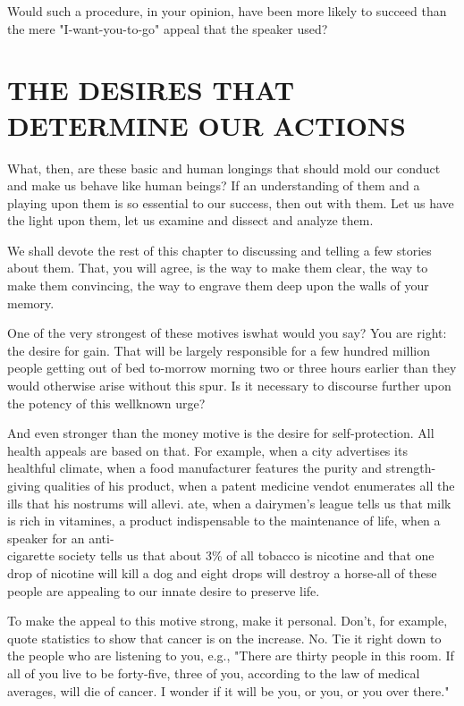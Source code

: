 \documentclass[10pt]{article}
\begin{document}
Would such a procedure, in your opinion, have been more likely to succeed than the mere "I-want-you-to-go" appeal that the speaker used?

\section*{THE DESIRES THAT DETERMINE OUR ACTIONS}
What, then, are these basic and human longings that should mold our conduct and make us behave like human beings? If an understanding of them and a playing upon them is so essential to our success, then out with them. Let us have the light upon them, let us examine and dissect and analyze them.

We shall devote the rest of this chapter to discussing and telling a few stories about them. That, you will agree, is the way to make them clear, the way to make them convincing, the way to engrave them deep upon the walls of your memory.

One of the very strongest of these motives iswhat would you say? You are right: the desire for gain. That will be largely responsible for a few hundred million people getting out of bed to-morrow morning two or three hours earlier than they would otherwise arise without this spur. Is it necessary to discourse further upon the potency of this wellknown urge?

And even stronger than the money motive is the desire for self-protection. All health appeals are based on that. For example, when a city advertises its healthful climate, when a food manufacturer features the purity and strength-giving qualities of his product, when a patent medicine vendot enumerates all the ills that his nostrums will allevi. ate, when a dairymen's league tells us that milk is rich in vitamines, a product indispensable to the maintenance of life, when a speaker for an anti-\\
cigarette society tells us that about $3 \%$ of all tobacco is nicotine and that one drop of nicotine will kill a dog and eight drops will destroy a horse-all of these people are appealing to our innate desire to preserve life.

To make the appeal to this motive strong, make it personal. Don't, for example, quote statistics to show that cancer is on the increase. No. Tie it right down to the people who are listening to you, e.g., "There are thirty people in this room. If all of you live to be forty-five, three of you, according to the law of medical averages, will die of cancer. I wonder if it will be you, or you, or you over there."
\end{document}
